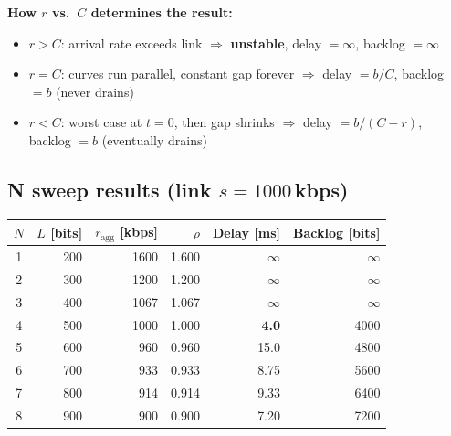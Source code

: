 \documentclass[10pt,a4paper]{article}
\begin{document}
\begin{keybox}
\textbf{How $r$ vs.\ $C$ determines the result:}
\begin{itemize}
  \item $r > C$: arrival rate exceeds link $\Rightarrow$ \textbf{unstable}, delay $= \infty$, backlog $= \infty$
  \item $r = C$: curves run parallel, constant gap forever $\Rightarrow$ delay $= b/C$, backlog $= b$ (never drains)
  \item $r < C$: worst case at $t{=}0$, then gap shrinks $\Rightarrow$ delay $= b/(C-r)$, backlog $= b$ (eventually drains)
\end{itemize}
\end{keybox}

\vspace{4pt}
\clearpage
\begin{minipage}[t]{0.52\textwidth}
\subsection{N sweep results (link $s = 1000$\,kbps)}
\vspace{2pt}
\begin{tabular}{@{}c|r|r|r|r|r@{}}
\toprule
$N$ & $L$ [bits] & $r_{\text{agg}}$ [kbps] & $\rho$ & Delay [ms] & Backlog [bits] \\\midrule
1 & 200 & 1600 & 1.600 & $\infty$ & $\infty$ \\
2 & 300 & 1200 & 1.200 & $\infty$ & $\infty$ \\
3 & 400 & 1067 & 1.067 & $\infty$ & $\infty$ \\
\rowcolor{defgreenbg}
4 & 500 & 1000 & 1.000 & \textbf{4.0} & 4000 \\
5 & 600 &  960 & 0.960 & 15.0 & 4800 \\
6 & 700 &  933 & 0.933 & 8.75 & 5600 \\
7 & 800 &  914 & 0.914 & 9.33 & 6400 \\
8 & 900 &  900 & 0.900 & 7.20 & 7200 \\\bottomrule
\end{tabular}
\end{minipage}\hfill
\end{document}
